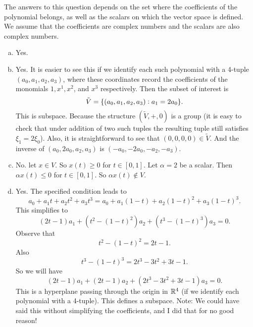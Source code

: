 \begin{problem}
	\begin{solution}
		The answers to this question depends on the set where the coefficients of the polynomial belongs, as well as the scalars on which the vector space is defined. We assume that the coefficients are complex numbers and the scalars are also complex numbers. 
		\begin{enumerate}[(a)]
			\item Yes.
			\item Yes. It is easier to see this if we identify each such polynomial with a 4-tuple $ (a_0,a_1,a_2,a_3) $, where these coordinates record the coefficients of the monomials $ 1,x^1,x^2$, and $ x^3 $ respectively. Then the subset of interest is 
			\[ \tilde V = \{(a_0,a_1,a_2,a_3): a_1 = 2a_0\}. \]
			This is subspace. Because the structure $ (\tilde V,+,0) $ is a group (it is easy to check that under addition of two such tuples the resulting tuple still satisfies $ \xi_1 = 2\xi_0 $). Also, it is straightforward to see that $ (0,0,0,0) \in \tilde V $. And the inverse of $ (a_0,2a_0,a_2,a_3) $ is $ (-a_0,-2a_0,-a_2,-a_3) $.
			\item No. let $ x\in V $. So $ x(t) \geq 0 $ for $ t\in [0,1] $. Let $ \alpha = 2 $ be a scalar. Then $ \alpha x(t) \leq 0 $ for $ t\in [0,1] $. So $ \alpha x(t) \notin V $.
			
			\item Yes. The specified condition leads to 
			\[ a_0 + a_1t + a_2t^2 + a_3t^3 = a_0 + a_1(1-t) + a_2(1-t)^2 + a_3(1-t)^3.  \]
			This simplifies to 
			\[ (2t-1)a_1 + (t^2-(1-t)^2)a_2 + (t^3 - (1-t)^3)a_3 = 0. \]
			Observe that
			\[ t^2 - (1-t)^2 = 2t-1. \]
			Also
			\[ t^3 - (1-t)^3 = 2t^3 - 3t^2 + 3t - 1. \]
			So we will have
			\[ (2t-1)a_1 + (2t-1)a_2 + (2t^3-3t^2+3t-1)a_3 = 0. \]
			This is a hyperplane passing through the origin in $ \mathbb{R}^4 $ (if we identify each polynomial with a 4-tuple). This defines a subspace. Note: We could have said this without simplifying the coefficients, and I did that for no good reason!
		\end{enumerate}
	\end{solution}
\end{problem}

